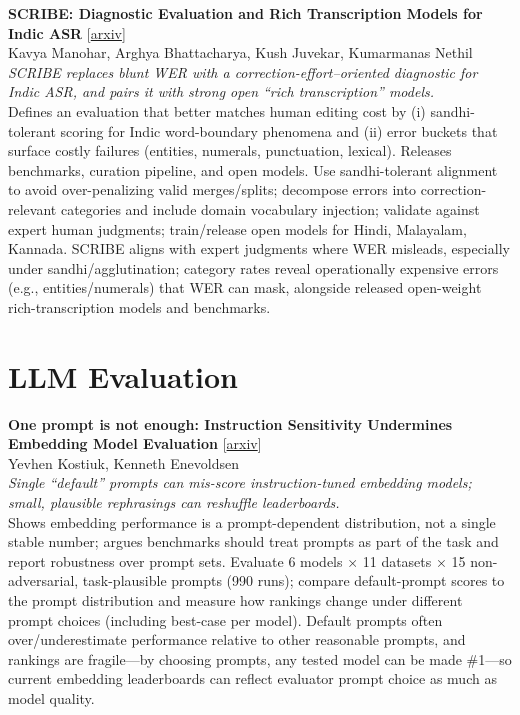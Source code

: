 \documentclass[12pt,letterpaper]{article}
\begin{document}
\medskip

{\small\textbf{SCRIBE: Diagnostic Evaluation and Rich Transcription Models for Indic ASR}} {\scriptsize[\href{https://arxiv.org/abs/2605.20712}{arxiv}]}\\
{\scriptsize Kavya Manohar, Arghya Bhattacharya, Kush Juvekar, Kumarmanas Nethil}\\

{\small\textit{SCRIBE replaces blunt WER with a correction-effort--oriented diagnostic for Indic ASR, and pairs it with strong open ``rich transcription'' models.}}\\[1pt]
{\footnotesize Defines an evaluation that better matches human editing cost by (i) sandhi-tolerant scoring for Indic word-boundary phenomena and (ii) error buckets that surface costly failures (entities, numerals, punctuation, lexical). Releases benchmarks, curation pipeline, and open models. Use sandhi-tolerant alignment to avoid over-penalizing valid merges/splits; decompose errors into correction-relevant categories and include domain vocabulary injection; validate against expert human judgments; train/release open models for Hindi, Malayalam, Kannada. SCRIBE aligns with expert judgments where WER misleads, especially under sandhi/agglutination; category rates reveal operationally expensive errors (e.g., entities/numerals) that WER can mask, alongside released open-weight rich-transcription models and benchmarks.}

\medskip


\section*{LLM Evaluation}

{\small\textbf{One prompt is not enough: Instruction Sensitivity Undermines Embedding Model Evaluation}} {\scriptsize[\href{https://arxiv.org/abs/2605.22544}{arxiv}]}\\
{\scriptsize Yevhen Kostiuk, Kenneth Enevoldsen}\\

{\small\textit{Single ``default'' prompts can mis-score instruction-tuned embedding models; small, plausible rephrasings can reshuffle leaderboards.}}\\[1pt]
{\footnotesize Shows embedding performance is a prompt-dependent distribution, not a single stable number; argues benchmarks should treat prompts as part of the task and report robustness over prompt sets. Evaluate 6 models × 11 datasets × 15 non-adversarial, task-plausible prompts (990 runs); compare default-prompt scores to the prompt distribution and measure how rankings change under different prompt choices (including best-case per model). Default prompts often over/underestimate performance relative to other reasonable prompts, and rankings are fragile---by choosing prompts, any tested model can be made \#1---so current embedding leaderboards can reflect evaluator prompt choice as much as model quality.}
\end{document}
